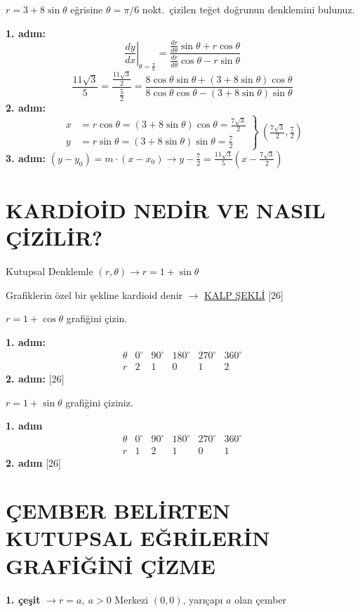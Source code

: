 \documentclass[11pt,a4paper]{article}
\begin{document}
\begin{ornek}
$r=3+8\sin\theta$ eğrisine $\theta=\pi/6$ nokt.\ çizilen teğet doğrunun denklemini bulunuz.
\end{ornek}
\noindent\textbf{1. adım:}
\[ \left.\frac{dy}{dx}\right|_{\theta=\frac{\pi}{6}}=\frac{\frac{dr}{d\theta}\sin\theta+r\cos\theta}{\frac{dr}{d\theta}\cos\theta-r\sin\theta} \]
\[ \frac{11\sqrt3}{5}=\frac{\frac{11\sqrt3}{2}}{\frac52}=\frac{8\cos\theta\sin\theta+(3+8\sin\theta)\cos\theta}{8\cos\theta\cos\theta-(3+8\sin\theta)\sin\theta} \]
\noindent\textbf{2. adım:}
\[ \left.\begin{aligned}x&=r\cos\theta=(3+8\sin\theta)\cos\theta=\tfrac{7\sqrt3}{2}\\ y&=r\sin\theta=(3+8\sin\theta)\sin\theta=\tfrac72\end{aligned}\right\}\ \left(\tfrac{7\sqrt3}{2},\tfrac72\right) \]
\noindent\textbf{3. adım:} $(y-y_0)=m\cdot(x-x_0)\longrightarrow y-\tfrac72=\tfrac{11\sqrt3}{5}\left(x-\tfrac{7\sqrt3}{2}\right)$

\section{KARDİOİD NEDİR VE NASIL ÇİZİLİR?}
Kutupsal Denklemle $(r,\theta)\longrightarrow r=1+\sin\theta$

Grafiklerin özel bir şekline kardioid denir $\longrightarrow$ \underline{KALP ŞEKLİ}
[26]
\begin{ornek}
$r=1+\cos\theta$ grafiğini çizin.
\end{ornek}
\noindent\textbf{1. adım:}
\[ \begin{array}{c|ccccc} \theta & 0^\circ & 90^\circ & 180^\circ & 270^\circ & 360^\circ\\\hline r & 2 & 1 & 0 & 1 & 2\end{array} \]
\noindent\textbf{2. adım:}
[26]
\begin{ornek}
$r=1+\sin\theta$ grafiğini çiziniz.
\end{ornek}
\noindent\textbf{1. adım}
\[ \begin{array}{c|ccccc} \theta & 0^\circ & 90^\circ & 180^\circ & 270^\circ & 360^\circ\\\hline r & 1 & 2 & 1 & 0 & 1\end{array} \]
\noindent\textbf{2. adım}
[26]

\section{ÇEMBER BELİRTEN KUTUPSAL EĞRİLERİN GRAFİĞİNİ ÇİZME}
\noindent\textbf{1. çeşit} $\longrightarrow r=a,\ a>0$ \quad Merkezi $(0,0)$, yarıçapı $a$ olan çember
\end{document}
